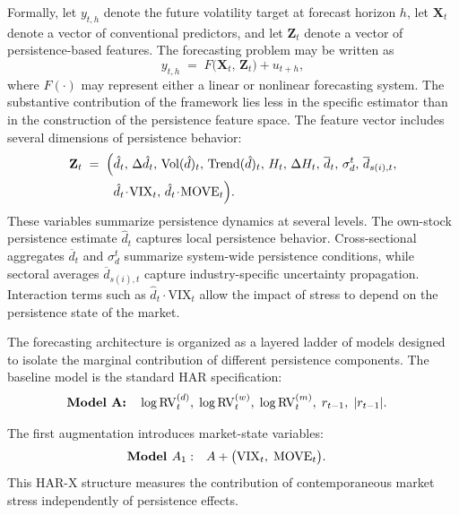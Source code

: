 \documentclass[unnumsec,webpdf,contemporary,large]{oup-authoring-template}%
\theoremstyle{thmstyleone}%
\theoremstyle{thmstyletwo}%
\theoremstyle{thmstylethree}%
\begin{document}
Formally, let $y_{t,h}$ denote the future volatility target at forecast
horizon $h$, let $\mathbf X_t$ denote a vector of conventional predictors,
and let $\mathbf Z_t$ denote a vector of persistence-based features. The
forecasting problem may be written as
\begin{equation}
  y_{t,h} \;=\; F\!\bigl(\mathbf X_t,\, \mathbf Z_t\bigr) + u_{t+h},
\end{equation}
where $F(\cdot)$ may represent either a linear or nonlinear forecasting
system. The substantive contribution of the framework lies less in the
specific estimator than in the construction of the persistence feature
space. The feature vector includes several dimensions of persistence
behavior:
\begin{equation}
\begin{split}
\mathbf{Z}_t \; = \; \Bigl( & \hat{d}_t, \, \Delta\hat{d}_t, \, \mathrm{Vol}(\hat{d})_t, \, \mathrm{Trend}(\hat{d})_t, \, H_t, \, \Delta H_t, \, \overline{d}_t, \, \sigma_d^t, \, \overline{d}_{s(i),t}, \\
& \hat{d}_t \!\cdot\! \mathrm{VIX}_t, \, \hat{d}_t \!\cdot\! \mathrm{MOVE}_t \Bigr).
\end{split}
\end{equation}
These variables summarize persistence dynamics at several levels. The
own-stock persistence estimate $ \hat{d}_t$ captures local persistence
behavior. Cross-sectional aggregates $\overline d_t$ and $\sigma_d^t$
summarize system-wide persistence conditions, while sectoral averages
$\overline d_{s(i),t}$ capture industry-specific uncertainty propagation.
Interaction terms such as $ \hat{d}_t\!\cdot\!\mathrm{VIX}_t$ allow the impact of
stress to depend on the persistence state of the market.

The forecasting architecture is organized as a layered ladder of models
designed to isolate the marginal contribution of different persistence
components. The baseline model is the standard HAR specification:
\begin{align}
  \textbf{Model A:}\quad
  &\log\mathrm{RV}^{(d)}_t,\;\log\mathrm{RV}^{(w)}_t,\;\log\mathrm{RV}^{(m)}_t,\;r_{t-1},\;|r_{t-1}|.
  \notag
\end{align}

The first augmentation introduces market-state variables:
\begin{align}
  \textbf{Model }A_1:\quad &A + \bigl(\mathrm{VIX}_t,\;\mathrm{MOVE}_t\bigr).
  \notag
\end{align}
This HAR-X structure measures the contribution of contemporaneous market
stress independently of persistence effects.
\end{document}
